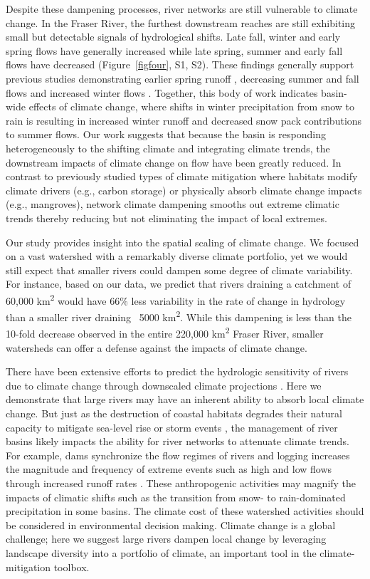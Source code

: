 \documentclass[linenumbers,draft]{AGUJournal}
\begin{document}
Despite these dampening processes, river networks are still vulnerable to climate change. In the Fraser River, the furthest downstream reaches are still exhibiting small but detectable signals of hydrological shifts. Late fall, winter and early spring flows have generally increased while late spring, summer and early fall flows have decreased (Figure~\ref{figfour}, S1, S2). These findings generally support previous studies demonstrating earlier spring runoff  \citep{Dery:2012}, decreasing summer and fall flows  \citep{Stahl:2006} and increased winter flows  \citep{Healey:2011}. Together, this body of work indicates basin-wide effects of climate change, where shifts in winter precipitation from snow to rain is resulting in increased winter runoff and decreased snow pack contributions to summer flows. Our work suggests that because the basin is responding heterogeneously to the shifting climate and integrating climate trends, the downstream impacts of climate change on flow have been greatly reduced. In contrast to previously studied types of climate mitigation where habitats modify climate drivers (e.g., carbon storage) or physically absorb climate change impacts (e.g., mangroves), network climate dampening smooths out extreme climatic trends thereby reducing but not eliminating the impact of local extremes.

Our study provides insight into the spatial scaling of climate change. We focused on a vast watershed with a remarkably diverse climate portfolio, yet we would still expect that smaller rivers could dampen some degree of climate variability. For instance, based on our data, we predict that rivers draining a catchment of 60,000 km\textsuperscript{2} would have 66\% less variability in the rate of change in hydrology than a smaller river draining ~5000 km\textsuperscript{2}. While this dampening is less than the 10-fold decrease observed in the entire 220,000 km\textsuperscript{2} Fraser River, smaller watersheds can offer a defense against the impacts of climate change.

There have been extensive efforts to predict the hydrologic sensitivity of rivers due to climate change through downscaled climate projections \citep{Nijssen:2001}. Here we demonstrate that large rivers may have an inherent ability to absorb local climate change. But just as the destruction of coastal habitats degrades their natural capacity to mitigate sea-level rise or storm events \citep{Arkema:2013}, the management of river basins likely impacts the ability for river networks to attenuate climate trends. For example, dams synchronize the flow regimes of rivers  \citep{Poff:2007} and logging increases the magnitude and frequency of extreme events such as high and low flows through increased runoff rates \citep{Zhang:2014}. These anthropogenic activities may magnify the impacts of climatic shifts such as the transition from snow- to rain-dominated precipitation in some basins. The climate cost of these watershed activities should be considered in environmental decision making. Climate change is a global challenge; here we suggest large rivers dampen local change by leveraging landscape diversity into a portfolio of climate, an important tool in the climate-mitigation toolbox.
\end{document}
